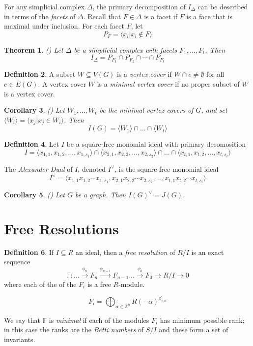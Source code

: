 \documentclass[paper=a4, fontsize=11pt]{scrartcl} %
\theoremstyle{plain}
\newtheorem{thm}{Theorem}[section]
\newtheorem{cor}[thm]{Corollary}
\theoremstyle{definition}
\newtheorem{defn}[thm]{Definition}
\begin{document}
For any simplicial complex $\Delta$, the primary decomposition of $I_{\Delta}$ can be described in terms of the \textit{facets} of $\Delta$. Recall that $F \in \Delta$ is a facet if $F$ is a face that is maximal under inclusion. For each facet $F$, let $$P_{F} = \langle x_i \vert x_i \notin F \rangle$$

\begin{thm} (\cite[Theorem 3.1.34]{Mo12}) Let $\Delta$ be a simplicial complex with facets $F_1, \dots, F_t$. Then $$I_{\Delta} = P_{F_1} \cap P_{F_2} \cap \cdots \cap P_{F_t}$$
\end{thm}

\begin{defn} A subset $W \subseteq V(G)$ is a \textit{vertex cover} if $W \cap e \neq \emptyset$ for all $e \in E(G)$. A vertex cover $W$ is a \textit{minimal vertex cover} if no proper subset of $W$ is a vertex cover.
\end{defn}

\begin{cor} (\cite[Corollary 3.1.35]{Mo12})
Let $W_1, \dots, W_t$ be the minimal vertex covers of $G$, and set $\langle W_i \rangle = \langle x_j \vert x_j \in W_i \rangle$. Then
$$I(G) = \langle W_1 \rangle \cap \dots \cap \langle W_t \rangle$$
\end{cor}

\begin{defn}
Let $I$ be a square-free monomial ideal with primary decomosition $$I = \langle x_{1,1}, x_{1,2}, \dots, x_{1,s_1} \rangle \cap \langle x_{2,1}, x_{2,2}, \dots, x_{2,s_2} \rangle \cap \dots \cap \langle x_{t,1}, x_{t,2}, \dots, x_{t,s_t} \rangle$$

The \textit{Alexander Dual} of $I$, denoted $I^{\vee}$, is the square-free monomial ideal $$I^{\vee} = \langle x_{1,1} x_{1,2} \cdots x_{1,s_1}, x_{2,1} x_{2,2} \cdots x_{2,s_2}, \dots, x_{t,1} x_{t,2} \cdots x_{t,s_t} \rangle$$
\end{defn}

\begin{cor} (\cite[Corollary 3.1.38]{Mo12})
Let $G$ be a graph. Then $I(G)^{\vee} = J(G)$.
\end{cor}

\section{Free Resolutions}
\begin{defn}
If $I \subseteq R$ an ideal, then a \textit{free resolution} of $R/I$ is an exact sequence $$\mathbb{F} : \dots \xrightarrow{\phi_{n}} F_n \xrightarrow{\phi_{n-1}} F_{n-1} \dots \xrightarrow{\phi_{0}} F_0 \rightarrow R/I \rightarrow 0$$ where each of the of the $F_i$ is a free $R$-module.

$$F_i = \bigoplus_{\alpha \in \mathbb{Z}^n} R(-\alpha)^{\beta_{i,\alpha}}$$

We say that $\mathbb{F}$ is \textit{minimal} if each of the modules $F_i$ has minimum possible rank; in this case the ranks are the \textit{Betti numbers} of $S/I$ and these form a set of invariants.
\end{defn}
\end{document}
